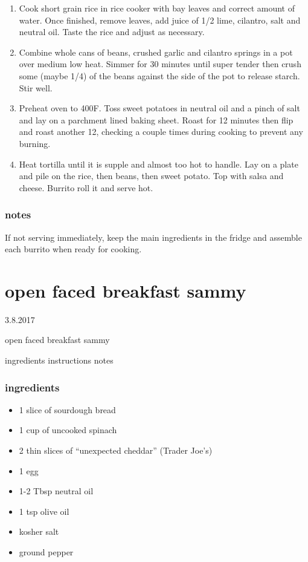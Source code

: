 \documentclass[]{book}
\providecommand{\tightlist}{%
  \setlength{\itemsep}{0pt}\setlength{\parskip}{0pt}}
\begin{document}
\begin{enumerate}
\def\labelenumi{\arabic{enumi}.}
\tightlist
\item
  Cook short grain rice in rice cooker with bay leaves and correct amount of water. Once finished, remove leaves, add juice of 1/2 lime, cilantro, salt and neutral oil. Taste the rice and adjust as necessary.
\item
  Combine whole cans of beans, crushed garlic and cilantro springs in a pot over medium low heat. Simmer for 30 minutes until super tender then crush some (maybe 1/4) of the beans against the side of the pot to release starch. Stir well.
\item
  Preheat oven to 400F. Toss sweet potatoes in neutral oil and a pinch of salt and lay on a parchment lined baking sheet. Roast for 12 minutes then flip and roast another 12, checking a couple times during cooking to prevent any burning.
\item
  Heat tortilla until it is supple and almost too hot to handle. Lay on a plate and pile on the rice, then beans, then sweet potato. Top with salsa and cheese. Burrito roll it and serve hot.
\end{enumerate}

\hypertarget{notes-11}{%
\subsection{notes}\label{notes-11}}

If not serving immediately, keep the main ingredients in the fridge and assemble each burrito when ready for cooking.

\hypertarget{open-faced-breakfast-sammy}{%
\chapter{open faced breakfast sammy}\label{open-faced-breakfast-sammy}}

3.8.2017

open faced breakfast sammy

ingredients \textbar{}
instructions \textbar{}
notes

\hypertarget{ingredients-12}{%
\subsection{ingredients}\label{ingredients-12}}

\begin{itemize}
\tightlist
\item
  1 slice of sourdough bread
\item
  1 cup of uncooked spinach
\item
  2 thin slices of ``unexpected cheddar'' (Trader Joe's)
\item
  1 egg
\item
  1-2 Tbsp neutral oil
\item
  1 tsp olive oil
\item
  kosher salt
\item
  ground pepper
\end{itemize}
\end{document}
